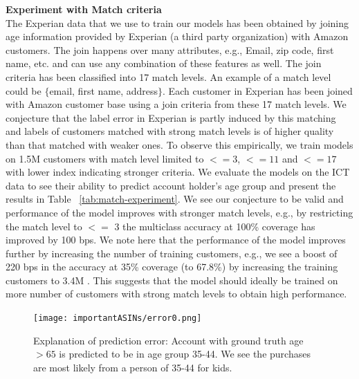 \vfill
%
\textbf{Experiment with Match criteria}\\
The Experian data that we use to train our models has been obtained by joining age information provided by Experian (a third party organization) with Amazon customers. The join happens over many attributes, e.g., Email, zip code, first name, etc. and can use any combination of these features as well. The join criteria has been classified into 17 match levels. An example of a match level could be $\{$email, first name, address$\}$.  Each customer in Experian has been joined with Amazon customer base using a join criteria from these 17 match levels. We conjecture that the label error in Experian is partly induced by this matching and labels of customers matched with strong match levels is of higher quality than that matched with weaker ones. 
%
To observe this empirically, we train models on 1.5M customers with match level limited to $<=3$, $<=11$ and $<=17$ with lower index indicating stronger criteria. We evaluate the models on the ICT data to see their ability to predict account holder's age group and present the results in Table ~\ref{tab:match-experiment}.  We see our conjecture to be valid and performance of the model improves with stronger match levels, e.g., by restricting the match level to $<=$ 3 the multiclass accuracy at 100\% coverage has improved by 100 bps. We note here that 
the performance of the model improves further by increasing the number of training customers, e.g., we see a boost of 220 bps in the accuracy at 35\% coverage (to 67.8\%) by increasing the training customers to 3.4M . This suggests that the model should ideally be trained on more number of customers with strong match levels to obtain high performance.
\begin{figure}[]
  \captionsetup{font=small}
  \centering
    \centering\texttt{[image: importantASINs/error0.png]}
  \caption{Explanation of prediction error: Account with ground truth age $>65$ is predicted to be in age group 35-44. We see the purchases are most likely from a person of 35-44 for kids.}
  \label{fig:error_analysis}
\end{figure}

